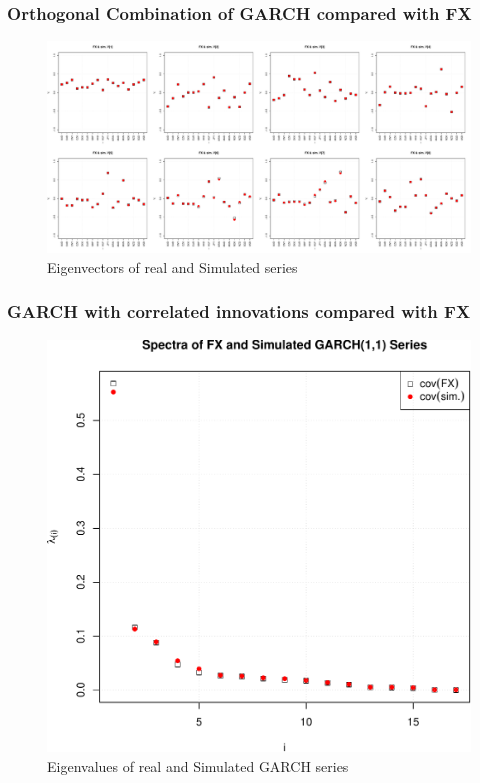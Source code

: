 \documentclass{beamer}
\begin{document}
\begin{frame}
  \frametitle{Orthogonal Combination of GARCH compared with FX}
  \begin{figure}[htb!]
    \centering
    \includegraphics[scale=0.2]{FX_OGARCH_eigenvectors.pdf}
    \caption{\scriptsize Eigenvectors of real and Simulated series}
  \end{figure}
\end{frame}

\begin{frame}
  \frametitle{GARCH with correlated innovations compared with FX}
  \begin{figure}[htb!]
    \centering
    \includegraphics[scale=0.35]{FX_eigenvalues.pdf}
    \caption{\scriptsize Eigenvalues of real and Simulated GARCH series}
  \end{figure}
\end{frame}
\end{document}
